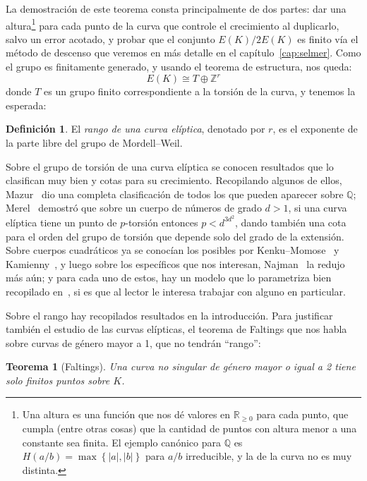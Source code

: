 \documentclass[a4paper]{book}
\theoremstyle{definition}
\newtheorem*{definition*}{Definición}
\theoremstyle{plain}
\newtheorem*{theorem*}{Teorema}
\newcommand{\RR}{\mathbb{R}}
\newcommand{\QQ}{\mathbb{Q}}
\newcommand{\ZZ}{\mathbb{Z}}
\newcommand{\lla}{\left\lbrace}
\newcommand{\rla}{\right\rbrace}
\begin{document}
La demostración de este teorema consta principalmente de dos partes: dar una altura\footnote{Una altura es una función que nos dé valores en $\RR_{\geq 0}$ para cada punto, que cumpla (entre otras cosas) que la cantidad de puntos con altura menor a una constante sea finita. El ejemplo canónico para $\QQ$ es $H(a/b) =\max \lla |a| , |b|\rla$ para $a/b$ irreducible, y la de la curva no es muy distinta.} para cada punto de la curva que controle el crecimiento al duplicarlo, salvo un error acotado, y probar que el conjunto $E(K)/2E(K)$ es finito vía el método de descenso que veremos en más detalle en el capítulo~\ref{cap:selmer}. Como el grupo es finitamente generado, y usando el teorema de estructura, nos queda:
\[
E(K) \cong T \oplus \ZZ^r
\]
donde $T$ es un grupo finito correspondiente a la torsión de la curva, y tenemos la esperada:

\begin{definition*}
El \emph{rango de una curva elíptica}, denotado por $r$, es el exponente de la parte libre del grupo de Mordell--Weil.
\end{definition*}

Sobre el grupo de torsión de una curva elíptica se conocen resultados que lo clasifican muy bien y cotas para su crecimiento. Recopilando algunos de ellos, Mazur~\cite{Mazur1977} dio una completa clasificación de todos los que pueden aparecer sobre $\QQ$; Merel~\cite{Merel1996} demostró que sobre un cuerpo de números de grado $d>1$, si una curva elíptica tiene un punto de $p$-torsión entonces $p<d^{3d^2}$, dando también una cota para el orden del grupo de torsión que depende solo del grado de la extensión. Sobre cuerpos cuadráticos ya se conocían los posibles por Kenku--Momose~\cite{KenkuMomose1988} y Kamienny~\cite{Kamienny1992}, y luego sobre los específicos que nos interesan, Najman~\cite{Najman2010} la redujo más aún; y para cada uno de estos, hay un modelo que lo parametriza bien recopilado en~\cite{Rabarison2010}, si es que al lector le interesa trabajar con alguno en particular.

Sobre el rango hay recopilados resultados en la introducción. Para justificar también el estudio de las curvas elípticas, el teorema de Faltings que nos habla sobre curvas de género mayor a 1, que no tendrán ``rango'':

\begin{theorem*}[Faltings]
Una curva no singular de género mayor o igual a 2 tiene solo finitos puntos sobre $K$.
\end{theorem*}
\end{document}
